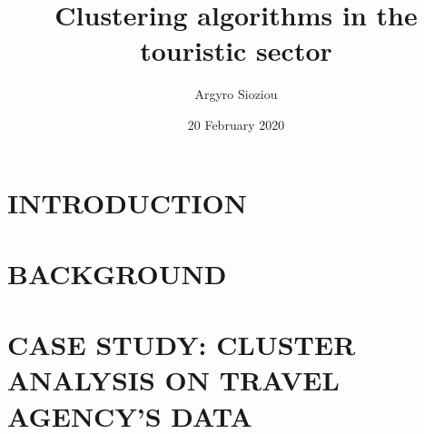 \documentclass[11pt, onside]{book}
\title{Clustering algorithms in the touristic sector}
\author{Argyro Sioziou}
\date{20 February 2020}
\begin{document}




\tableofcontents

\chapter{INTRODUCTION}


\chapter{BACKGROUND}


\chapter{CASE STUDY: CLUSTER ANALYSIS ON TRAVEL AGENCY'S DATA}


\printbibliography
{}
\end{document}
